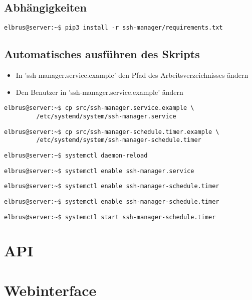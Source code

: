 \documentclass{article}
\begin{document}
	\subsection[init commands]{Abhängigkeiten}
	\begin{lstlisting}[caption={Installieren von fehlenden python3 Packages.}]
		elbrus@server:~$ pip3 install -r ssh-manager/requirements.txt
	\end{lstlisting}


	\subsection[systemd service]{Automatisches ausführen des Skripts}
	\begin{itemize}
		\item In 'ssh-manager.service.example' den Pfad des Arbeitsverzeichnisses ändern
		\item Den Benutzer in 'ssh-manager.service.example' ändern
	\end{itemize}

	\begin{lstlisting}[caption={Kopieren des Serviceprogrammes}]
		elbrus@server:~$ cp src/ssh-manager.service.example \
		 /etc/systemd/system/ssh-manager.service
	\end{lstlisting}

	\begin{lstlisting}[caption={Kopieren des Zeitplanungsprogrammes.}]
		elbrus@server:~$ cp src/ssh-manager-schedule.timer.example \
		 /etc/systemd/system/ssh-manager-schedule.timer
	\end{lstlisting}

	\begin{lstlisting}[caption={Neuladen des 'systemctl' Deamons}]
		elbrus@server:~$ systemctl daemon-reload
	\end{lstlisting}

	\begin{lstlisting}[caption={Aktivieren des Serviceprogrammes}]
		elbrus@server:~$ systemctl enable ssh-manager.service
	\end{lstlisting}

	\begin{lstlisting}[caption={Aktivieren des Zeitplanungsprogrammes}]
		elbrus@server:~$ systemctl enable ssh-manager-schedule.timer
	\end{lstlisting}

	\begin{lstlisting}[caption={Aktivieren des Zeitplanungsprogrammes}]
		elbrus@server:~$ systemctl enable ssh-manager-schedule.timer
	\end{lstlisting}

	\begin{lstlisting}[caption={Starten des Zeitplanungsprogrammes}]
		elbrus@server:~$ systemctl start ssh-manager-schedule.timer
	\end{lstlisting}
	\newpage
	
	\section{API}
	\newpage
	
	\section{Webinterface}
	\newpage
\end{document}
